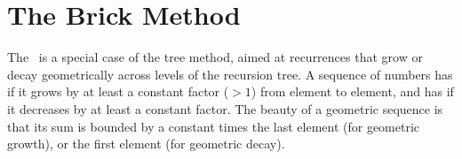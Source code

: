 \section{The Brick Method}
\label{sec:analysis::recurrences::brick-method}

\begin{cluster}
\label{grp:grm:analysis::recurrences::brick}

\begin{gram}
\label{grm:analysis::recurrences::brick}
  The~ is a special case of the tree method, aimed
  at recurrences that grow or decay geometrically across levels of the
  recursion tree.
  A sequence of numbers has  if it grows by at
  least a constant factor ($> 1$) from element to element, and has  if it decreases by at least a constant
  factor.  
  The beauty of a geometric sequence is that its sum is
  bounded by a constant times the last element (for geometric growth), or
  the first element (for geometric decay).

\end{gram}
\end{cluster}

